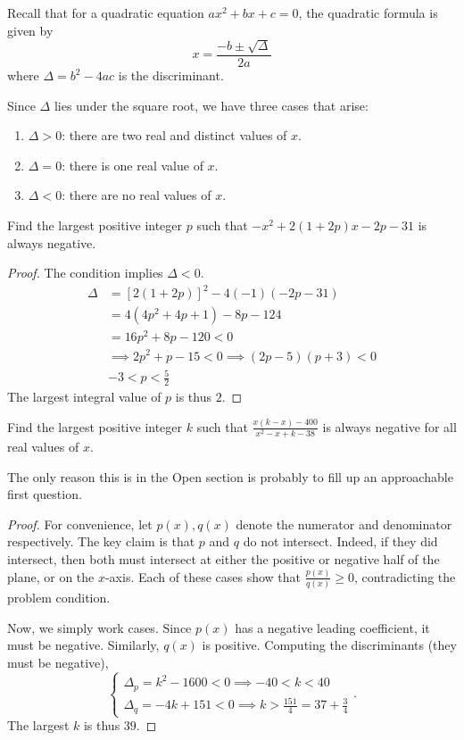 \documentclass[../jarvis.tex]{subfiles}
\begin{document}
\begin{proposition}
    Recall that for a quadratic equation $ax^2+bx+c=0$, the quadratic formula is given by
    $$x=\frac{-b\pm\sqrt{\Delta}}{2a}$$
    where $\Delta=b^2-4ac$ is the discriminant.

    Since $\Delta$ lies under the square root, we have three cases that arise:
    \begin{enumerate}
        \item $\Delta > 0$: there are two real and distinct values of $x$.
        \item $\Delta = 0$: there is one real value of $x$.
        \item $\Delta < 0$: there are no real values of $x$.
    \end{enumerate}
\end{proposition}

\begin{example}[2016 SMO(S) P12]
    Find the largest positive integer $p$ such that $-x^2+2(1+2p)x-2p-31$ is always negative.
\end{example}
\begin{proof}
    The condition implies $\Delta < 0$.
    \begin{align*}
        \Delta &= [2(1+2p)]^2-4(-1)(-2p-31) \\
        &= 4(4p^2+4p+1)-8p-124 \\
        &=16p^2+8p-120 < 0 \\
        &\implies 2p^2+p-15<0 \implies (2p-5)(p+3) < 0 \\
        &-3 < p < \frac{5}{2}
    \end{align*}
    The largest integral value of $p$ is thus $\boxed{2}$.
\end{proof}
\begin{example}[2019 SMO(O) P1]
    Find the largest positive integer $k$ such that $\frac{x(k-x)-400}{x^2-x+k-38}$ is always negative for all real values of $x$.
\end{example}
The only reason this is in the Open section is probably to fill up an approachable first question.

\begin{proof}
    For convenience, let $p(x), q(x)$ denote the numerator and denominator respectively. The key claim is that $p$ and $q$ do not intersect. Indeed, if they did intersect, then both must intersect at either the positive or negative half of the plane, or on the $x$-axis. Each of these cases show that $\frac{p(x)}{q(x)}\geq 0$, contradicting the problem condition. 
    
    Now, we simply work cases. Since $p(x)$ has a negative leading coefficient, it must be negative. Similarly, $q(x)$ is positive. Computing the discriminants (they must be negative),
    $$
    \begin{cases}
        \Delta_{p}=k^2-1600 < 0 \implies -40 < k < 40 \\
        \Delta_{q}=-4k+151 < 0 \implies k > \frac{151}{4}=37+\frac{3}{4}
    \end{cases}.$$
    The largest $k$ is thus $\boxed{39}$.
\end{proof}
\end{document}
